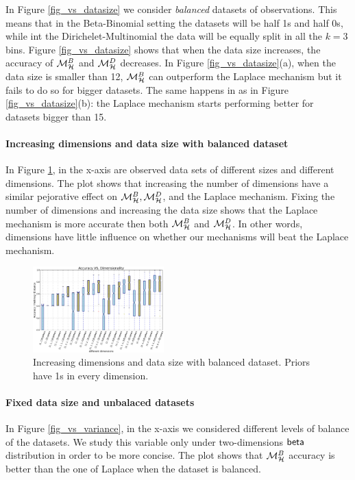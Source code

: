 \documentclass[sigconf, anonymous]{acmart}
\begin{document}
In Figure \ref{fig_vs_datasize} we consider \emph{balanced} datasets of observations.
This means that in the Beta-Binomial setting the datasets will be
half 1s and half 0s, while int the Dirichelet-Multinomial the data will be
equally split in all the $k=3$ bins. Figure \ref{fig_vs_datasize} shows that  when the
data size increases, the accuracy of $\mathcal{M}^{B}_{\mathcal{H}}$ and $\mathcal{M}^{D}_{\mathcal{H}}$
decreases. In Figure \ref{fig_vs_datasize}(a), when the data size is
smaller than 12, $\mathcal{M}^{B}_{\mathcal{H}}$ can outperform the Laplace mechanism but it fails to do so
for bigger datasets. The same happens in as in Figure \ref{fig_vs_datasize}(b):
the Laplace mechanism starts performing better for datasets bigger than 15. 

\paragraph{Increasing dimensions and data size with balanced dataset}
\label{subsubsec_vs_dimension}
In Figure  \ref{fig_vs_dimension}, in the x-axis are observed data sets of
different sizes and different dimensions. The plot shows that increasing the number of dimensions have
a similar pejorative effect on $\mathcal{M}^{B}_{\mathcal{H}}, \mathcal{M}^{D}_{\mathcal{H}}$, and the Laplace
mechanism. Fixing the number of dimensions and increasing the data size shows that
the Laplace mechanism is more accurate then both $\mathcal{M}^{B}_{\mathcal{H}}$ and $\mathcal{M}^{D}_{\mathcal{H}}$. 
In other words, dimensions have little influence on whether our mechanisms will beat the Laplace
mechanism.
\begin{figure}[ht]
\centering
\includegraphics[width=0.45\textwidth]{accuracy_vs_dimension.eps}
\caption{Increasing dimensions and data size with balanced dataset. Priors have 1s in every dimension.}
\label{fig_vs_dimension}
\end{figure}

\paragraph{Fixed data size and unbalaced datasets}
\label{subsubsec_vs_variance}
In Figure \ref{fig_vs_variance}, in the x-axis we considered different levels
of balance of the datasets. We  study this variable only under
two-dimensions $\mathsf{beta}$ distribution in order to be more concise. The plot shows
that $\mathcal{M}^{B}_{\mathcal{H}}$ accuracy is better than the one of Laplace when the dataset is balanced.
\end{document}
